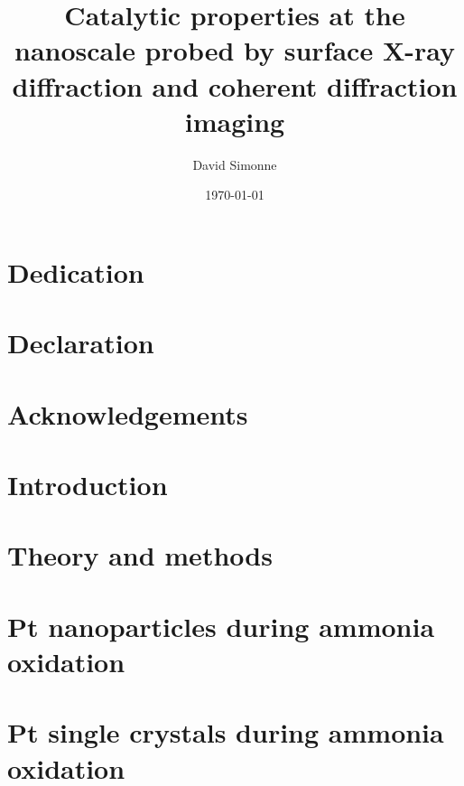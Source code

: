 \documentclass[11pt]{report}
\title{Catalytic properties at the nanoscale probed by surface X-ray diffraction and coherent diffraction imaging}
\author{David Simonne}
\date{\today}
\begin{document}
    

    \chapter*{Dedication}
    
    \chapter*{Declaration}
    
    \chapter*{Acknowledgements}
    

\frontmatter
{\hypersetup{linkcolor=black}
    \tableofcontents
}
\newpage

\mainmatter
    \chapter{Introduction}
    
     
    \chapter{Theory and methods}
    
    
    
    
    
    
    
    \chapter{Pt nanoparticles during ammonia oxidation}
    
    
    
    
    

    \chapter{Pt single crystals during ammonia oxidation}
    
    
    
    
\end{document}
